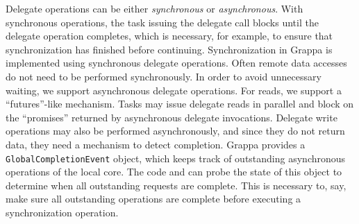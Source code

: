 
Delegate operations can be either {\em synchronous} or {\em asynchronous}.
With synchronous operations, the task issuing the delegate call blocks until
the delegate operation completes, which is necessary, for example, to ensure
that synchronization has finished before continuing. Synchronization in Grappa
is implemented using synchronous delegate operations. Often remote data
accesses do not need to be performed synchronously. In order to avoid
unnecessary waiting, we support asynchronous delegate operations. For reads,
we support a ``futures''-like mechanism. Tasks may issue delegate reads in
parallel and block on the ``promises'' returned by asynchronous delegate
invocations. Delegate write operations may also be performed asynchronously,
and since they do not return data, they need a mechanism to detect completion.
Grappa provides a \texttt{GlobalCompletionEvent} object, which keeps track of
outstanding asynchronous operations of the local core. The code and can probe
the state of this object to determine when all outstanding requests are
complete. This is necessary to, say, make sure all outstanding operations are
complete before executing a synchronization operation.


